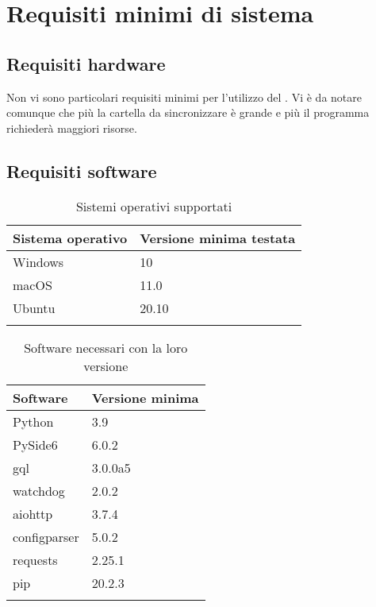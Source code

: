 \section{Requisiti minimi di sistema}

\subsection{Requisiti hardware}

Non vi sono particolari requisiti minimi per l'utilizzo del . Vi è da notare comunque che più la cartella da sincronizzare è grande e più il programma richiederà maggiori risorse.

\subsection{Requisiti software}
{
	\setlength{\freewidth}{\dimexpr\textwidth-1\tabcolsep}
	\renewcommand{\arraystretch}{1.5}
	\setlength{\aboverulesep}{0pt}
	\setlength{\belowrulesep}{0pt}
	\begin{longtable}{L{.210\freewidth} C{.68\freewidth}}
		\textbf{Sistema operativo} & \textbf{Versione minima testata} \\
		\toprule
		\endhead
		Windows & 10 \\
		macOS & 11.0 \\
		Ubuntu & 20.10 \\

		\bottomrule
		\hiderowcolors
		\caption{Sistemi operativi supportati}
	\end{longtable}
}
{
	\setlength{\freewidth}{\dimexpr\textwidth-1\tabcolsep}
	\renewcommand{\arraystretch}{1.5}
	\setlength{\aboverulesep}{0pt}
	\setlength{\belowrulesep}{0pt}
	\begin{longtable}{L{.210\freewidth} L{.68\freewidth}}
		\textbf{Software} & \textbf{Versione minima} \\
		\toprule
		\endhead
		Python & 3.9 \\
		PySide6 & 6.0.2 \\
		gql & 3.0.0a5 \\
		watchdog & 2.0.2 \\
		aiohttp & 3.7.4 \\
		configparser & 5.0.2 \\
		requests & 2.25.1 \\
		pip & 20.2.3 \\
		\bottomrule
		\hiderowcolors
		\caption{Software necessari con la loro versione}
	\end{longtable}
}


